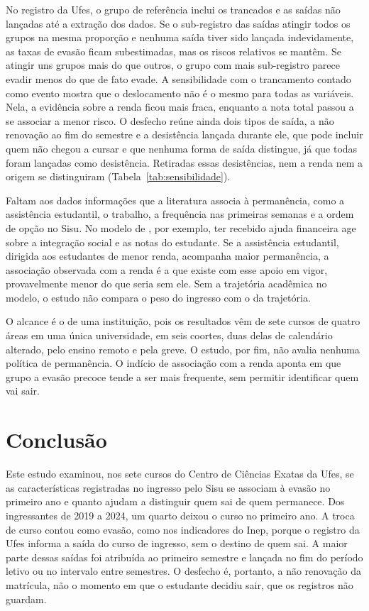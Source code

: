 \documentclass[12pt,a4paper]{article}
\begin{document}
No registro da Ufes, o grupo de referência inclui os trancados e as saídas não lançadas até a extração dos dados. Se o sub-registro das saídas atingir todos os grupos na mesma proporção e nenhuma saída tiver sido lançada indevidamente, as taxas de evasão ficam subestimadas, mas os riscos relativos se mantêm. Se atingir uns grupos mais do que outros, o grupo com mais sub-registro parece evadir menos do que de fato evade. A sensibilidade com o trancamento contado como evento mostra que o deslocamento não é o mesmo para todas as variáveis. Nela, a evidência sobre a renda ficou mais fraca, enquanto a nota total passou a se associar a menor risco. O desfecho reúne ainda dois tipos de saída, a não renovação ao fim do semestre e a desistência lançada durante ele, que pode incluir quem não chegou a cursar e que nenhuma forma de saída distingue, já que todas foram lançadas como desistência. Retiradas essas desistências, nem a renda nem a origem se distinguiram (Tabela~\ref{tab:sensibilidade}).

Faltam aos dados informações que a literatura associa à permanência, como a assistência estudantil, o trabalho, a frequência nas primeiras semanas e a ordem de opção no Sisu. No modelo de \citet[pp.~585, 589]{cabrera1992role}, por exemplo, ter recebido ajuda financeira age sobre a integração social e as notas do estudante. Se a assistência estudantil, dirigida aos estudantes de menor renda, acompanha maior permanência, a associação observada com a renda é a que existe com esse apoio em vigor, provavelmente menor do que seria sem ele. Sem a trajetória acadêmica no modelo, o estudo não compara o peso do ingresso com o da trajetória.

O alcance é o de uma instituição, pois os resultados vêm de sete cursos de quatro áreas em uma única universidade, em seis coortes, duas delas de calendário alterado, pelo ensino remoto e pela greve. O estudo, por fim, não avalia nenhuma política de permanência. O indício de associação com a renda aponta em que grupo a evasão precoce tende a ser mais frequente, sem permitir identificar quem vai sair.

\section{Conclusão}
\label{sec:conclusao}

Este estudo examinou, nos sete cursos do Centro de Ciências Exatas da Ufes, se as características registradas no ingresso pelo Sisu se associam à evasão no primeiro ano e quanto ajudam a distinguir quem sai de quem permanece. Dos ingressantes de 2019 a 2024, um quarto deixou o curso no primeiro ano. A troca de curso contou como evasão, como nos indicadores do Inep, porque o registro da Ufes informa a saída do curso de ingresso, sem o destino de quem sai. A maior parte dessas saídas foi atribuída ao primeiro semestre e lançada no fim do período letivo ou no intervalo entre semestres. O desfecho é, portanto, a não renovação da matrícula, não o momento em que o estudante decidiu sair, que os registros não guardam.
\end{document}
